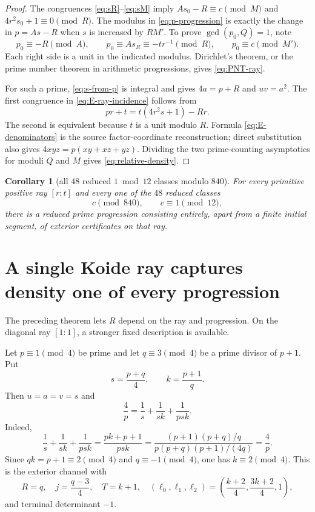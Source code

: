 \documentclass[11pt]{article}
\newtheorem{corollary}[theorem]{Corollary}
\theoremstyle{definition}
\theoremstyle{remark}
\newcommand{\1}{\mathbf 1}
\begin{document}
\begin{proof}
The congruences \eqref{eq:sR}--\eqref{eq:sM} imply
$As_0-R\equiv c\pmod M$ and $4r^2s_0+1\equiv0\pmod R$.
The modulus in \eqref{eq:p-progression} is exactly the change in $p=As-R$
when $s$ is increased by $RM'$.  To prove $\gcd(p_0,Q)=1$, note
\[
 p_0\equiv-R\pmod A,
 \qquad
 p_0\equiv As_R\equiv-tr^{-1}\pmod R,
 \qquad
 p_0\equiv c\pmod{M'}.
\]
Each right side is a unit in the indicated modulus.  Dirichlet's theorem, or
the prime number theorem in arithmetic progressions, gives
\eqref{eq:PNT-ray}.

For such a prime, \eqref{eq:s-from-p} is integral and gives $4a=p+R$ and
$uv=a^2$.  The first congruence in \eqref{eq:E-ray-incidence} follows from
\[
 pr+t=t(4r^2s+1)-Rr.
\]
The second is equivalent because $t$ is a unit modulo $R$.  Formula
\eqref{eq:E-denominators} is the source factor-coordinate reconstruction;
direct substitution also gives
$4xyz=p(xy+xz+yz)$.  Dividing the two prime-counting asymptotics for moduli
$Q$ and $M$ gives \eqref{eq:relative-density}.
\end{proof}

\begin{corollary}[all $48$ reduced $1\bmod12$ classes modulo $840$]
For every primitive positive ray $[r:t]$ and every one of the $48$ reduced
classes
\begin{equation}\label{eq:48classes}
 c\pmod{840},\qquad c\equiv1\pmod{12},
\end{equation}
there is a reduced prime progression consisting entirely, apart from a finite
initial segment, of exterior certificates on that ray.
\end{corollary}

\section{A single Koide ray captures density one of every progression}

The preceding theorem lets $R$ depend on the ray and progression.  On the
diagonal ray $[1:1]$, a stronger fixed description is available.

Let $p\equiv1\pmod4$ be prime and let $q\equiv3\pmod4$ be a prime divisor of
$p+1$.  Put
\begin{equation}\label{eq:diagonal-sk}
 s=\frac{p+q}{4},\qquad k=\frac{p+1}{q}.
\end{equation}
Then $u=a=v=s$ and
\begin{equation}\label{eq:diagonal-identity}
 \boxed{
 \frac4p=\frac1s+\frac1{sk}+\frac1{psk}.}
\end{equation}
Indeed,
\[
 \frac1s+\frac1{sk}+\frac1{psk}
 =\frac{pk+p+1}{psk}
 =\frac{(p+1)(p+q)/q}{p(p+q)(p+1)/(4q)}
 =\frac4p.
\]
Since $qk=p+1\equiv2\pmod4$ and $q\equiv-1\pmod4$, one has
$k\equiv2\pmod4$.  This is the exterior channel with
\begin{equation}\label{eq:diagonal-terminal}
 R=q,
 \quad j=\frac{q-3}{4},
 \quad T=k+1,
 \quad
 (\ell_0,\ell_1,\ell_2)
 =\left(\frac{k+2}{4},\frac{3k+2}{4},1\right),
\end{equation}
and terminal determinant $-1$.
\end{document}

